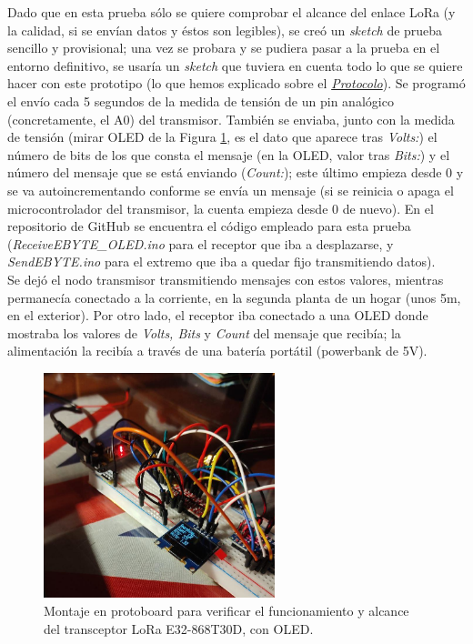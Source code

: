 \documentclass[12pt]{article}
\begin{document}
	\noindent  Dado que en esta prueba sólo se quiere comprobar el alcance del enlace LoRa (y la calidad, si se envían datos y éstos son legibles), se creó un \textit{sketch} de prueba sencillo y provisional; una vez se probara y se pudiera pasar a la prueba en el entorno definitivo, se usaría un \textit{sketch} que tuviera en cuenta todo lo que se quiere hacer con este prototipo (lo que hemos explicado sobre el \hyperref[protocolo explicacion]{\textit{Protocolo}}). Se programó el envío cada 5 segundos de la medida de tensión de un pin analógico (concretamente, el A0) del transmisor. También se enviaba, junto con la medida de tensión (mirar OLED de la Figura \ref{protoboard lora oled}, es el dato que aparece tras \textit{Volts:}) el número de bits de los que consta el mensaje (en la OLED, valor tras \textit{Bits:}) y el número del mensaje que se está enviando (\textit{Count:}); este último empieza desde 0 y se va autoincrementando conforme se envía un mensaje (si se reinicia o apaga el microcontrolador del transmisor, la cuenta empieza desde 0 de nuevo). En el repositorio de GitHub se encuentra el código empleado para esta prueba (\textit{ReceiveEBYTE\_OLED.ino} para el receptor que iba a desplazarse, y \textit{SendEBYTE.ino} para el extremo que iba a quedar fijo transmitiendo datos).\\
	
	\noindent Se dejó el nodo transmisor transmitiendo mensajes con estos valores, mientras permanecía conectado a la corriente, en la segunda planta de un hogar (unos 5m, en el exterior). Por otro lado, el receptor iba conectado a una OLED donde mostraba los valores de \textit{Volts, Bits} y \textit{Count} del mensaje que recibía; la alimentación la recibía a través de una batería portátil (powerbank de 5V).  \\
	
	
	
	\begin{figure}[h!]
		\begin{center}
			\includegraphics[width=0.6\textwidth]{img/prueba_lora_protoboard_oled.png}
			\caption{Montaje en protoboard para verificar el funcionamiento y alcance del transceptor LoRa E32-868T30D, con OLED.}
			\label{protoboard lora oled}
		\end{center}
	\end{figure}
\end{document}
